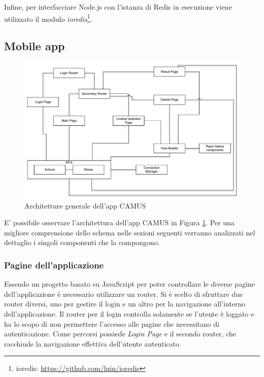 Infine, per interfacciare Node.js con l'istanza di Redis in esecuzione viene utilizzato il modulo \emph{ioredis}\footnote{ioredis: \url{https://github.com/luin/ioredis}}.

\subsection {Mobile app}\label{sec:architettura-applicazione}

\begin{figure}[h]
	\centering
	\includegraphics[width=\textwidth]{4-progettazione-alto-livello/Immagini/app_architecture.pdf}
	\caption{Architetture generale dell'app CAMUS}\label{fig:app-architecture}
\end{figure}

E’ possibile osservare l’architettura dell’app CAMUS in Figura \ref{fig:app-architecture}. Per una migliore comprensione dello schema nelle sezioni seguenti verranno analizzati nel dettaglio i singoli componenti che la compongono.

\subsubsection{Pagine dell'applicazione}

Essendo un progetto basato su JavaScript per poter controllare le diverse pagine dell'applicazione è necessario utilizzare un router. Si è scelto di sfruttare due router diversi, uno per gestire il login e un altro per la navigazione all'interno dell'applicazione. Il router per il login controlla solamente se l'utente è loggato e ha lo scopo di non permettere l'accesso alle pagine che necessitano di autenticazione. Come percorsi possiede \emph{Login Page} e il secondo router, che racchiude la navigazione effettiva dell'utente autenticato.

